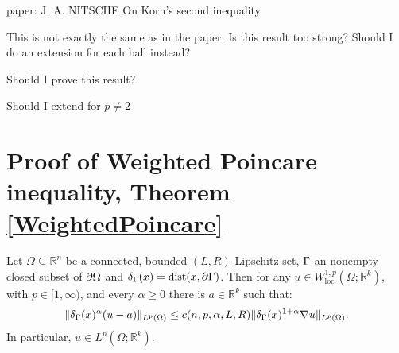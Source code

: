 paper: J. A. NITSCHE
On Korn’s second inequality
\begin{question}
    This is not exactly the same as in the paper. Is this result too strong? Should I do an extension for each ball instead?

    Should I prove this result?

    Should I extend for $p\neq 2$
\end{question}
\section{ Proof of Weighted Poincare inequality, Theorem \ref{WeightedPoincare}}
\begin{theorem} \label{WeightedPoincare} Let $\Omega \subseteq \mathbb{R}^n$ be a connected, bounded $(L, R)$-Lipschitz set,  $\Gamma$ an nonempty closed subset of $\partial\Omega$  and $\delta_\Gamma(x)=\operatorname{dist}(x, \partial\Gamma)$. Then for any $u \in W_{\mathrm{loc}}^{1, p}\left(\Omega ; \mathbb{R}^k\right)$, with $p \in[1, \infty)$, and every $\alpha\geq0$ there is $a \in \mathbb{R}^k$ such that:
$$
\|\delta_\Gamma(x)^\alpha (u-a)\|_{L^p(\Omega)} \leq c(n,p,\alpha,L,R)\|\delta_\Gamma(x)^{1+\alpha} \nabla u\|_{L^p(\Omega)} .
$$
In particular, $u \in L^p\left(\Omega ; \mathbb{R}^k\right)$. 
\end{theorem}

